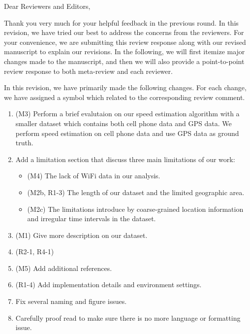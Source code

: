 \noindent Dear Reviewers and Editors,
\bigskip

Thank you very much for your helpful feedback in the previous round. In this revision, we have tried our best to address the concerns from the reviewers. For your convenience, we are submitting this review response along with our revised manuscript to explain our revisions. In the following, we will first itemize major changes made to the manuscript, and then we will also provide a point-to-point review response to both meta-review and each reviewer.

\bigskip
In this revision, we have primarily made the following changes. For each change, we have assigned a symbol which related to the corresponding review comment.
\begin{enumerate}
  \item (M3) Perform a brief evalutaion on our speed estimation algorithm with a smaller dataset which contains both cell phone data and GPS data. We perform speed estimation on cell phone data and use GPS data as ground truth. 
  \item Add a limitation section that discuss three main limitations of our work:
	\begin{itemize}
    \item (M4) The lack of WiFi data in our analysis.
    \item (M2b, R1-3) The length of our dataset and the limited geographic area.
		\item (M2c) The limitations introduce by coarse-grained location information and irregular time intervals in the dataset.
  \end{itemize}
  \item (M1) Give more description on our dataset.
	\item (R2-1, R4-1) 
  \item (M5) Add additional references.
	\item (R1-4) Add implementation details and environment settings.
	\item Fix several naming and figure issues. 
  \item Carefully proof read to make sure there is no more language or formatting issue.
\end{enumerate}

